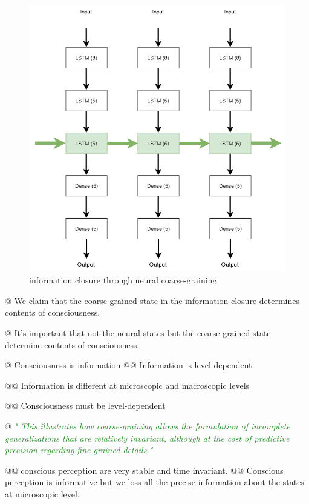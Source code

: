 \documentclass[utf8]{article}
\newenvironment{ants}
			{
			 \begin{easylist}[itemize]
			}
			{
			\end{easylist}
			}
\newcommand{\rewrite}[1]{\textcolor{ForestGreen}{\textit{"#1"}}\newline}
\begin{document}
		\begin{figure}[h]
			\includegraphics[width=\textwidth]{CGandIC.png}
			\caption{information closure through neural coarse-graining}
			\label{fig:CGandIC}
		\end{figure}
	
	
		\begin{ants}
			@ We claim that the coarse-grained state in the information closure determines contents of consciousness. 
			
			@ It's important that not the neural states but the coarse-grained state determine contents of consciousness. 
			
			@ Consciousness is information 
				@@ Information is level-dependent.
				
				@@ Information is different at microscopic and macroscopic levels
				
				@@ Consciousness must be level-dependent 		
				
			
			@ \rewrite{
				This illustrates how coarse-graining allows the formulation of incomplete generalizations that are relatively invariant, although at the cost of predictive precision regarding fine-grained details.} \cite{price2007causation}
			
				@@ conscious perception are very stable and time invariant.
				@@ Conscious perception is informative but we loss all the precise information about the states at microscopic level. 

		\end{ants}
		   
\end{document}
